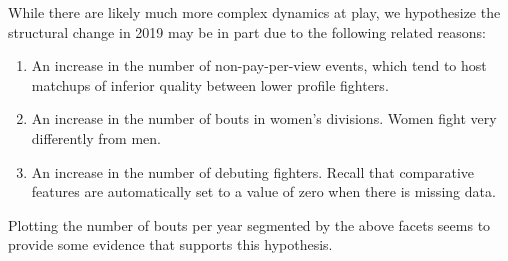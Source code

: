 \documentclass[12pt,twoside]{report}
\begin{document}
While there are likely much more complex dynamics at play, we hypothesize the structural change in 2019 may be in part due to the following related reasons:
\begin{enumerate}
    \item An increase in the number of non-pay-per-view events, which tend to host matchups of inferior quality between lower profile fighters.

    \item An increase in the number of bouts in women's divisions. Women fight very differently from men.

    \item An increase in the number of debuting fighters. Recall that comparative features are automatically set to a value of zero when there is missing data.
\end{enumerate}
Plotting the number of bouts per year segmented by the above facets seems to provide some evidence that supports this hypothesis.
\end{document}
